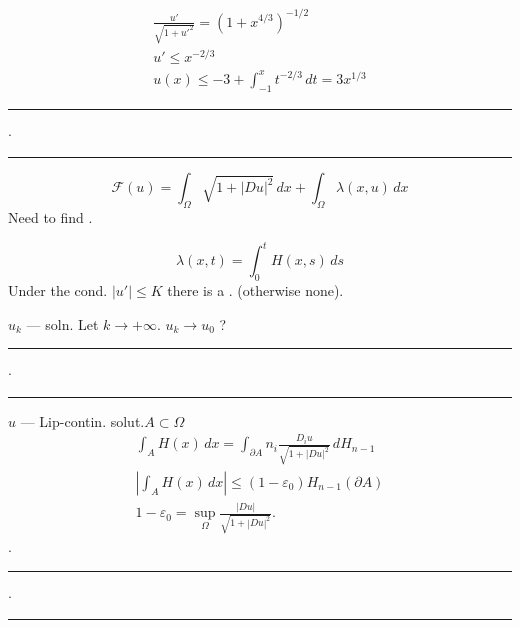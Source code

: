 \begin{gather*}
\frac{u'}{\sqrt{1+u'^2}}=(1+x^{4/3})^{-1/2}\\
u'\le x^{-2/3}\\
u(x)\le -3+\int_{-1}^{x}t^{-2/3}\,dt=3x^{1/3}
\end{gather*}
\hfill\rule{1.4cm}{.35pt}\enspace\(\cdot\)\enspace\rule{1.4cm}{.35pt}\par
\[
\mathcal F(u)=\int_\Omega\sqrt{1+|Du|^2}\,dx+\int_\Omega\lambda(x,u)\,dx
\]
\hfill Need to find .\par
\[
\lambda(x,t)=\int_0^t H(x,s)\,ds
\]
Under the cond. \(|u'|\le K\) there is a . (otherwise none).

\(u_k\) — soln. Let \(k\to+\infty\). \qquad \(u_k\to u_0\) ?
\hfill\rule{1.4cm}{.35pt}\enspace\(\cdot\)\enspace\rule{1.4cm}{.35pt}\par
\(u\) — Lip-contin. solut.\qquad \(A\subset\Omega\)
\begin{gather*}
\int_A H(x)\,dx=\int_{\partial A} n_i\frac{D_i u}{\sqrt{1+|Du|^2}}\,dH_{n-1}\\
\left|\int_A H(x)\,dx\right|\le(1-\varepsilon_0)H_{n-1}(\partial A)\\
\boxed{1-\varepsilon_0=\sup_{\Omega}\frac{|Du|}{\sqrt{1+|Du|^2}}.}
\end{gather*}
.
\hfill\rule{1.4cm}{.35pt}\enspace\(\cdot\)\enspace\rule{1.4cm}{.35pt}\par


